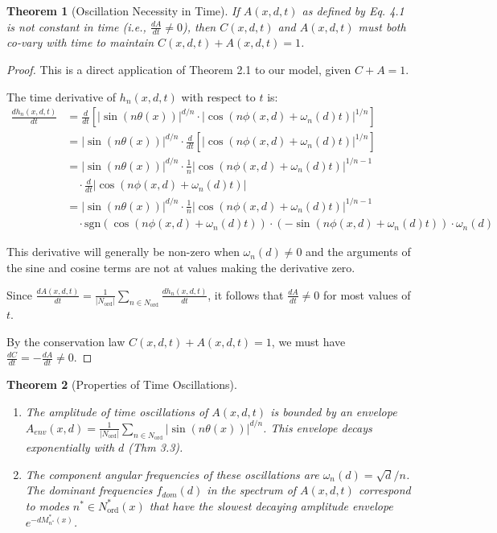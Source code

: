 \documentclass[11pt,a4paper]{article}
\newtheorem{theorem}{Theorem}[section]
\begin{document}
\begin{theorem}[Oscillation Necessity in Time]
If $A(x,d,t)$ as defined by Eq. 4.1 is not constant in time (i.e., $\frac{dA}{dt} \neq 0$), then $C(x,d,t)$ and $A(x,d,t)$ must both co-vary with time to maintain $C(x,d,t)+A(x,d,t)=1$.
\end{theorem}

\begin{proof}
This is a direct application of Theorem 2.1 to our model, given $C+A=1$.

The time derivative of $h_n(x,d,t)$ with respect to $t$ is:
\begin{align}
\frac{dh_n(x,d,t)}{dt} &= \frac{d}{dt}\left[|\sin(n\theta(x))|^{d/n} \cdot |\cos(n\phi(x,d) + \omega_n(d)t)|^{1/n}\right] \\
&= |\sin(n\theta(x))|^{d/n} \cdot \frac{d}{dt}\left[|\cos(n\phi(x,d) + \omega_n(d)t)|^{1/n}\right] \\
&= |\sin(n\theta(x))|^{d/n} \cdot \frac{1}{n}|\cos(n\phi(x,d) + \omega_n(d)t)|^{1/n-1} \\
&\quad \cdot \frac{d}{dt}|\cos(n\phi(x,d) + \omega_n(d)t)| \\
&= |\sin(n\theta(x))|^{d/n} \cdot \frac{1}{n}|\cos(n\phi(x,d) + \omega_n(d)t)|^{1/n-1} \\
&\quad \cdot \text{sgn}(\cos(n\phi(x,d) + \omega_n(d)t)) \cdot (-\sin(n\phi(x,d) + \omega_n(d)t)) \cdot \omega_n(d)
\end{align}

This derivative will generally be non-zero when $\omega_n(d) \neq 0$ and the arguments of the sine and cosine terms are not at values making the derivative zero.

Since $\frac{dA(x,d,t)}{dt} = \frac{1}{|N_{\text{ord}}|} \sum_{n \in N_{\text{ord}}} \frac{dh_n(x,d,t)}{dt}$, it follows that $\frac{dA}{dt} \neq 0$ for most values of $t$.

By the conservation law $C(x,d,t) + A(x,d,t) = 1$, we must have $\frac{dC}{dt} = -\frac{dA}{dt} \neq 0$.
\end{proof}

\begin{theorem}[Properties of Time Oscillations]
\begin{enumerate}[label=(\alph*)]
\item The amplitude of time oscillations of $A(x,d,t)$ is bounded by an envelope $A_{env}(x,d) = \frac{1}{|N_{\text{ord}}|} \sum_{n \in N_{\text{ord}}} |\sin(n\theta(x))|^{d/n}$. This envelope decays exponentially with $d$ (Thm 3.3).
\item The component angular frequencies of these oscillations are $\omega_n(d) = \sqrt{d}/n$. The dominant frequencies $f_{dom}(d)$ in the spectrum of $A(x,d,t)$ correspond to modes $n^* \in N_{\text{ord}}^*(x)$ that have the slowest decaying amplitude envelope $e^{-dM_{n^*}^*(x)}$.
\end{enumerate}
\end{theorem}
\end{document}
